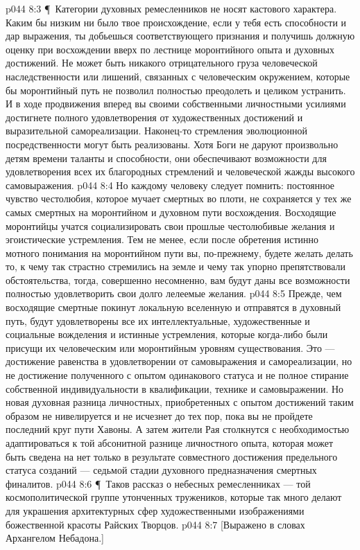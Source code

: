 \vs p044 8:3 \P\ Категории духовных ремесленников не носят кастового характера. Каким бы низким ни было твое происхождение, если у тебя есть способности и дар выражения, ты добьешься соответствующего признания и получишь должную оценку при восхождении вверх по лестнице моронтийного опыта и духовных достижений. Не может быть никакого отрицательного груза человеческой наследственности или лишений, связанных с человеческим окружением, которые бы моронтийный путь не позволил полностью преодолеть и целиком устранить. И в ходе продвижения вперед вы своими собственными личностными усилиями достигнете полного удовлетворения от художественных достижений и выразительной самореализации. Наконец\hyp{}то стремления эволюционной посредственности могут быть реализованы. Хотя Боги не даруют произвольно детям времени таланты и способности, они обеспечивают возможности для удовлетворения всех их благородных стремлений и человеческой жажды высокого самовыражения.
\vs p044 8:4 Но каждому человеку следует помнить: постоянное чувство честолюбия, которое мучает смертных во плоти, не сохраняется у тех же самых смертных на моронтийном и духовном пути восхождения. Восходящие моронтийцы учатся социализировать свои прошлые честолюбивые желания и эгоистические устремления. Тем не менее, если после обретения истинно мотного понимания на моронтийном пути вы, по\hyp{}прежнему, будете желать делать то, к чему так страстно стремились на земле и чему так упорно препятствовали обстоятельства, тогда, совершенно несомненно, вам будут даны все возможности полностью удовлетворить свои долго лелеемые желания.
\vs p044 8:5 Прежде, чем восходящие смертные покинут локальную вселенную и отправятся в духовный путь, будут удовлетворены все их интеллектуальные, художественные и социальные вожделения и истинные устремления, которые когда\hyp{}либо были присущи их человеческим или моронтийным уровням существования. Это --- достижение равенства в удовлетворении от самовыражения и самореализации, но не достижение полученного с опытом одинакового статуса и не полное стирание собственной индивидуальности в квалификации, технике и самовыражении. Но новая духовная разница личностных, приобретенных с опытом достижений таким образом не нивелируется и не исчезнет до тех пор, пока вы не пройдете последний круг пути Хавоны. А затем жители Рая столкнутся с необходимостью адаптироваться к той абсонитной разнице личностного опыта, которая может быть сведена на нет только в результате совместного достижения предельного статуса созданий --- седьмой стадии духовного предназначения смертных финалитов.
\vs p044 8:6 \P\ Таков рассказ о небесных ремесленниках --- той космополитической группе утонченных тружеников, которые так много делают для украшения архитектурных сфер художественными изображениями божественной красоты Райских Творцов.
\vs p044 8:7 [Выражено в словах Архангелом Небадона.]

